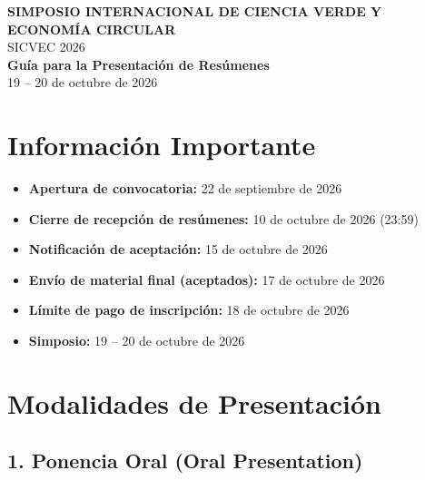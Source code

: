 \documentclass[12pt,a4paper]{article}
\begin{document}

\thispagestyle{empty}

\begin{center}
{\Large\bfseries\color{verdeosc} SIMPOSIO INTERNACIONAL DE CIENCIA VERDE Y ECONOMÍA CIRCULAR}\\
{\normalsize\color{verdemid} SICVEC 2026}\\[1cm]
{\Large\bfseries Guía para la Presentación de Resúmenes}\\[0.3cm]
{\normalsize 19 -- 20 de octubre de 2026}\\[1cm]
\end{center}

\section*{Información Importante}

\begin{tcolorbox}[cajainfo, title=Fechas Clave]
\begin{itemize}[label={\textcolor{verdemid}{\textbullet}}]
  \item \textbf{Apertura de convocatoria:} 22 de septiembre de 2026
  \item \textbf{Cierre de recepción de resúmenes:} 10 de octubre de 2026 (23:59)
  \item \textbf{Notificación de aceptación:} 15 de octubre de 2026
  \item \textbf{Envío de material final (aceptados):} 17 de octubre de 2026
  \item \textbf{Límite de pago de inscripción:} 18 de octubre de 2026
  \item \textbf{Simposio:} 19 -- 20 de octubre de 2026
\end{itemize}
\end{tcolorbox}

\newpage

\section{Modalidades de Presentación}

\subsection{1. Ponencia Oral (Oral Presentation)}
\end{document}
